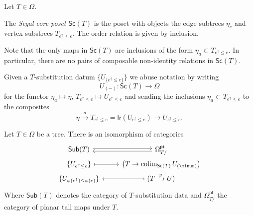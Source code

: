 \documentclass[a4paper,10pt]{article}%
\begin{document}
\begin{definition}
	Let $T \in \Omega$. 
	
	The \textit{Segal core poset $\mathsf{Sc}(T)$} is the poset with objects the edge subtrees $\eta_e$ and vertex substrees $T_{e^{\uparrow} \leq e}$. The order relation is given by inclusion.
\end{definition}

\begin{remark}
Note that the only maps in $\mathsf{Sc}(T)$ are inclusions of the form $\eta_a \subset T_{e^{\uparrow}\leq e}$.
In particular, there are no pairs of composable non-identity relations in $\mathsf{Sc}(T)$. 
\end{remark}

Given a $T$-substitution datum $\{U_{\{e^{\uparrow}\leq e\}}\}$ we abuse notation by writing
\[U_{(\minus)} \colon \mathsf{Sc}(T) \to \Omega\]
for the functor $\eta_a \mapsto \eta$, $T_{e^{\uparrow} \leq e} \mapsto U_{e^{\uparrow} \leq e}$  
and sending the inclusions $\eta_a \subset T_{e^{\uparrow} \leq e}$
to the composites
\[
\eta \xrightarrow{a} T_{e^{\uparrow} \leq e} = 
\mathsf{lr}(U_{e^{\uparrow}\leq e}) \to U_{e^{\uparrow} \leq e}.\]


\begin{proposition}\label{SUBDATAUNDERPLAN PROP}
Let $T \in \Omega$ be a tree. There is an isomorphism of categories
\begin{equation}\label{SUBDATAUNDERPLAN EQ}
\begin{tikzcd}[row sep =0pt]
	\mathsf{Sub}(T) \ar[r,shift left=2pt] &
	\Omega_{T/}^{\mathsf{pt}} \ar[l,shift left=2pt]
\\
	\{U_{e^{\uparrow} \leq e}\} \ar[r,mapsto] & 
	\left(T \to \colim_{\mathsf{Sc}(T)} U_{(\minus)}\right)
\\
	\{U_{\varphi(e^{\uparrow}) \leq \varphi(e)}\} &
	(T \xrightarrow{\varphi} U) \ar[l,mapsto]
\end{tikzcd}
\end{equation}
Where $\mathsf{Sub}(T)$ denotes the category of $T$-substitution data and $\Omega_{T/}^{\mathsf{pt}}$
the category of planar tall maps under $T$. 
\end{proposition}
\end{document}
